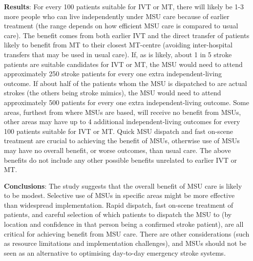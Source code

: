 \textbf{Results}: For every 100 patients suitable for IVT or MT, there will likely be 1-3 more people who can live independently under MSU care because of earlier treatment (the range depends on how efficient MSU care is compared to usual care). The benefit comes from both earlier IVT and the direct transfer of patients likely to benefit from MT to their closest MT-centre (avoiding inter-hospital transfers that may be used in usual care). If, as is likely, about 1 in 5 stroke patients are suitable candidates for IVT or MT, the MSU would need to attend approximately 250 stroke patients for every one extra independent-living outcome. If about half of the patients whom the MSU is dispatched to are actual strokes (the others being stroke mimics), the MSU would need to attend approximately 500 patients for every one extra independent-living outcome. Some areas, furthest from where MSUs are based, will receive no benefit from MSUs, other areas may have up to 4 additional independent-living outcomes for every 100 patients suitable for IVT or MT. Quick MSU dispatch and fast on-scene treatment are crucial to achieving the benefit of MSUs, otherwise use of MSUs may have no overall benefit, or worse outcomes, than usual care. The above benefits do not include any other possible benefits unrelated to earlier IVT or MT.

\textbf{Conclusions}: The study suggests that the overall benefit of MSU care is likely to be modest. Selective use of MSUs in specific areas might be more effective than widespread implementation. Rapid dispatch, fast on-scene treatment of patients, and careful selection of which patients to dispatch the MSU to (by location and confidence in that person being a confirmed stroke patient), are all critical for achieving benefit from MSU care. There are other considerations (such as resource limitations and implementation challenges), and MSUs should not be seen as an alternative to optimising day-to-day emergency stroke systems.